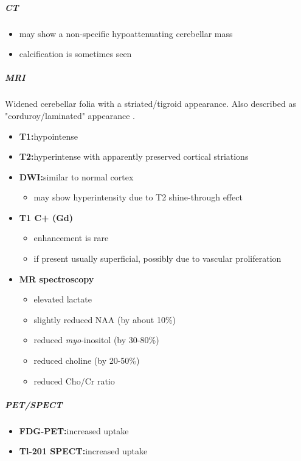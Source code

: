 \subparagraph{CT}

\begin{itemize}
	\item
	may show a non-specific hypoattenuating cerebellar mass
	\item
	calcification is sometimes seen 
\end{itemize}

\subparagraph{MRI}

Widened cerebellar folia with a striated/tigroid appearance. Also described as "corduroy/laminated" appearance .

\begin{itemize}
	\item
	\textbf{T1:}hypointense 
	\item
	\textbf{T2:}hyperintense with apparently preserved cortical striations 
	\item
	\textbf{DWI:}similar to normal cortex
	
	\begin{itemize}
		\item
		may show hyperintensity due to T2 shine-through effect
	\end{itemize}
	\item
	\textbf{T1 C+ (Gd)}
	
	\begin{itemize}
		\item
		enhancement is rare
		\item
		if present usually superficial, possibly due to vascular proliferation 
	\end{itemize}
	\item
	\textbf{MR spectroscopy}
	
	\begin{itemize}
		\item
		elevated lactate 
		\item
		slightly reduced NAA (by about 10\%) 
		\item
		reduced \emph{myo}-inositol (by 30-80\%)
		\item
		reduced choline (by 20-50\%)
		\item
		reduced Cho/Cr ratio 
	\end{itemize}
\end{itemize}


\subparagraph{PET/SPECT}

\begin{itemize}
	\item
	\textbf{FDG-PET:}increased uptake
	\item
	\textbf{Tl-201 SPECT:}increased uptake
\end{itemize}


